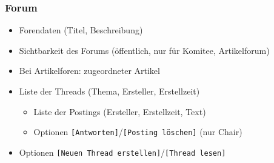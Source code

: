 \documentclass[headexclude,footexclude,12pt,BCOR0pt,DIV15]{scrartcl}
\begin{document}
        \subsubsection{Forum}
        \begin{itemize}
            \item Forendaten (Titel, Beschreibung)
            \item Sichtbarkeit des Forums (\"{o}ffentlich, nur f\"{u}r Komitee, Artikelforum)
            \item Bei Artikelforen: zugeordneter Artikel
            \item Liste der Threads (Thema, Ersteller, Erstellzeit)
            \begin{itemize}
                \item Liste der Postings (Ersteller, Erstellzeit, Text)
                \item Optionen \texttt{[Antworten]}/\texttt{[Posting l\"{o}schen]} (nur Chair)
            \end{itemize}
            \item Optionen \texttt{[Neuen Thread erstellen]}/\texttt{[Thread lesen]}
        \end{itemize}

\pagebreak
\end{document}
